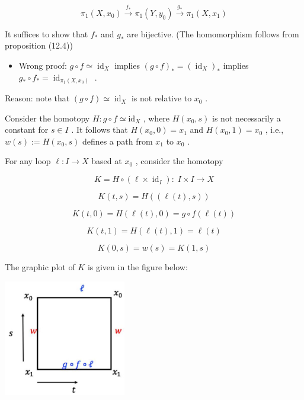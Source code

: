 \[
{\pi }_{1}\left( {X,{x}_{0}}\right) \overset{{f}_{ * }}{ \rightarrow  }{\pi }_{1}\left( {Y,{y}_{0}}\right) \overset{{g}_{ * }}{ \rightarrow  }{\pi }_{1}\left( {X,{x}_{1}}\right)
\]

It suffices to show that \({f}_{ * }\) and \({g}_{ * }\) are bijective. (The homomorphism follows from proposition (12.4))

\begin{itemize}
\item Wrong proof: \(g \circ  f \simeq  {\operatorname{id}}_{X}\) implies \({\left( g \circ  f\right) }_{ * } = {\left( {\operatorname{id}}_{X}\right) }_{ * }\) implies \({g}_{ * } \circ  {f}_{ * } = {\operatorname{id}}_{{\pi }_{1}\left( {X,{x}_{0}}\right) }\) .
\end{itemize}

Reason: note that \(\left( {g \circ  f}\right)  \simeq  {\operatorname{id}}_{X}\) is not relative to \({x}_{0}\) .

Consider the homotopy \(H : g \circ  f \simeq  {\mathrm{{id}}}_{X}\) , where \(H\left( {{x}_{0},s}\right)\) is not necessarily a constant for \(s \in  I\) . It follows that \(H\left( {{x}_{0},0}\right)  = {x}_{1}\) and \(H\left( {{x}_{0},1}\right)  = {x}_{0}\) , i.e., \(w\left( s\right)  \mathrel{\text{ := }} H\left( {{x}_{0},s}\right)\) defines a path from \({x}_{1}\) to \({x}_{0}\) .

For any loop \(\ell  : I \rightarrow  X\) based at \({x}_{0}\) , consider the homotopy

\[
K = H \circ  \left( {\ell  \times  {\operatorname{id}}_{I}}\right)  : \;I \times  I \rightarrow  X
\]

\[
K\left( {t,s}\right)  = H\left( \left( {\ell \left( t\right) ,s}\right) \right)
\]

\[
K\left( {t,0}\right)  = H\left( {\ell \left( t\right) ,0}\right)  = g \circ  f\left( {\ell \left( t\right) }\right)
\]

\[
K\left( {t,1}\right)  = H\left( {\ell \left( t\right) ,1}\right)  = \ell \left( t\right)
\]

\[
K\left( {0,s}\right)  = w\left( s\right)  = K\left( {1,s}\right)
\]

The graphic plot of \(K\) is given in the figure below:

\begin{center}
\includegraphics[max width=0.4\textwidth]{images/bo_d2bcsrref24c73avs720_123_558_340_483_462_0.jpg}
\end{center}
\hspace*{3em} 

